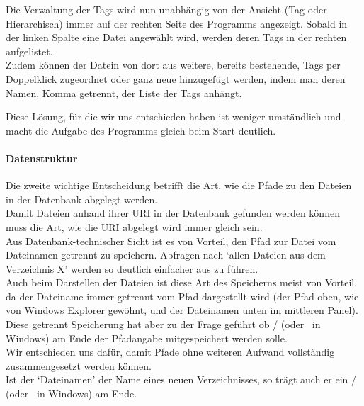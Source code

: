 \documentclass[10pt,paper=a4,final]{scrartcl}
\begin{document}
Die Verwaltung der Tags wird nun unabh\"angig von der Ansicht (Tag oder Hierarchisch) immer auf der rechten Seite des Programms angezeigt. Sobald in der linken Spalte eine Datei angew\"ahlt wird, werden deren Tags in der rechten aufgelistet.\\
Zudem k\"onnen der Datein von dort aus weitere, bereits bestehende, Tags per Doppelklick zugeordnet oder ganz neue hinzugef\"ugt werden, indem man deren Namen, Komma getrennt, der Liste der Tags anh\"angt.

Diese L\"osung, f\"ur die wir uns entschieden haben ist weniger umst\"andlich und macht die Aufgabe des Programms gleich beim Start deutlich.
\paragraph{Datenstruktur}
Die zweite wichtige Entscheidung betrifft die Art, wie die Pfade zu den Dateien in der Datenbank abgelegt werden.\\
Damit Dateien anhand ihrer URI in der Datenbank gefunden werden k\"onnen muss die Art, wie die URI abgelegt wird immer gleich sein.\\
Aus Datenbank-technischer Sicht ist es von Vorteil, den Pfad zur Datei vom Dateinamen getrennt zu speichern. Abfragen nach ‘allen Dateien aus dem Verzeichnis X’ werden so deutlich einfacher aus zu f\"uhren.\\
Auch beim Darstellen der Dateien ist diese Art des Speicherns meist von Vorteil, da der Dateiname immer getrennt vom Pfad dargestellt wird (der Pfad oben, wie von Windows Explorer gew\"ohnt, und der Dateinamen unten im mittleren Panel).\\
Diese getrennt Speicherung hat aber zu der Frage gef\"uhrt ob / (oder \ in Windows) am Ende der Pfadangabe mitgespeichert werden solle.\\
Wir entschieden uns daf\"ur, damit Pfade ohne weiteren Aufwand vollst\"andig zusammengesetzt werden k\"onnen.\\
Ist der ‘Dateinamen’ der Name eines neuen Verzeichnisses, so tr\"agt auch er ein / (oder \ in Windows) am Ende.
\newpage
\end{document}
